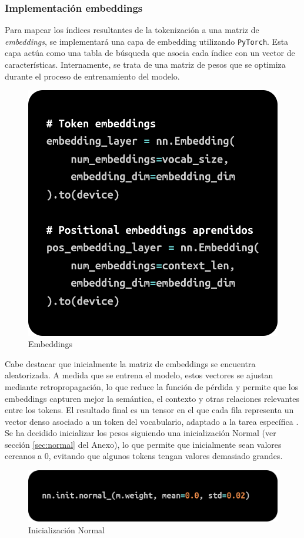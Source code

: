 \documentclass[11pt]{book}
\theoremstyle{plain}
\theoremstyle{definition}
\begin{document}
\subsubsection{Implementación embeddings}
Para mapear los índices resultantes de la tokenización a una matriz de \textit{embeddings}, se implementará una capa de embedding utilizando \texttt{PyTorch}. Esta capa actúa como una tabla de búsqueda que asocia cada índice con un vector de características. Internamente, se trata de una matriz de pesos que se optimiza durante el proceso de entrenamiento del modelo.

\begin{figure}[h]
    \centering
    \includegraphics[width=0.5\linewidth]{img/embeddings1.png}
    \caption{Embeddings}
    \label{fig:placeholder17}
\end{figure}

Cabe destacar que inicialmente la matriz de embeddings se encuentra aleatorizada. A medida que se entrena el modelo, estos vectores se ajustan mediante retropropagación, lo que reduce la función de pérdida y permite que los embeddings capturen mejor la semántica, el contexto y otras relaciones relevantes entre los tokens. El resultado final es un tensor en el que cada fila representa un vector denso asociado a un token del vocabulario, adaptado a la tarea específica \parencite{bao2022embedding}. Se ha decidido inicializar los pesos siguiendo una inicialización Normal (ver sección \ref{sec:normal} del Anexo), lo que permite que inicialmente sean valores cercanos a 0, evitando que algunos tokens tengan valores demasiado grandes. 

\begin{figure}[h]
    \centering
    \includegraphics[width=0.5\linewidth]{img/normal_init.png}
    \caption{Inicialización Normal}
    \label{fig:placeholder18}
\end{figure}
\end{document}
